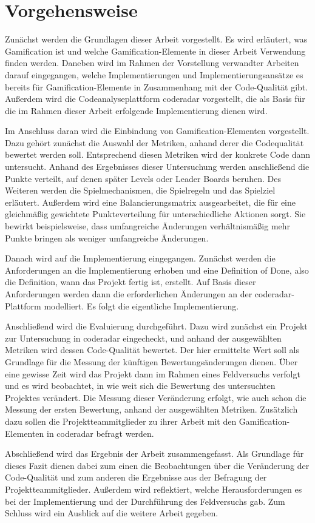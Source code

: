 \documentclass[fontsize=11pt, paper=a4, parskip=half]{scrartcl}
\begin{document}
\section{Vorgehensweise}
Zunächst werden die Grundlagen dieser Arbeit vorgestellt.
Es wird erläutert, was Gamification ist und welche Gamification-Elemente in dieser Arbeit Verwendung finden werden.
Daneben wird im Rahmen der Vorstellung verwandter Arbeiten darauf eingegangen, welche Implementierungen und Implementierungsansätze es bereits für Gamification-Elemente in Zusammenhang mit der Code-Qualität gibt.
Außerdem wird die Codeanalyseplattform coderadar vorgestellt, die als Basis für die im Rahmen dieser Arbeit erfolgende Implementierung dienen wird.

Im Anschluss daran wird die Einbindung von Gamification-Elementen vorgestellt.
Dazu gehört zunächst die Auswahl der Metriken, anhand derer die Codequalität bewertet werden soll.
Entsprechend diesen Metriken wird der konkrete Code dann untersucht.
Anhand des Ergebnisses dieser Untersuchung werden anschließend die Punkte verteilt, auf denen später Levels oder Leader Boards beruhen.
Des Weiteren werden die Spielmechanismen, die Spielregeln und das Spielziel erläutert.
Außerdem wird eine Balancierungsmatrix ausgearbeitet, die für eine gleichmäßig gewichtete Punkteverteilung für unterschiedliche Aktionen sorgt.
Sie bewirkt beispielsweise, dass umfangreiche Änderungen verhältnismäßig mehr Punkte bringen als weniger umfangreiche Änderungen.

Danach wird auf die Implementierung eingegangen.
Zunächst werden die Anforderungen an die Implementierung erhoben und eine Definition of Done, also die Definition, wann das Projekt fertig ist, erstellt.
Auf Basis dieser Anforderungen werden dann die erforderlichen Änderungen an der coderadar-Plattform modelliert.
Es folgt die eigentliche Implementierung.

Anschließend wird die Evaluierung durchgeführt.
Dazu wird zunächst ein Projekt zur Untersuchung in coderadar eingecheckt, und anhand der ausgewählten Metriken wird dessen Code-Qualität bewertet.
Der hier ermittelte Wert soll als Grundlage für die Messung der künftigen Bewertungsänderungen dienen.
Über eine gewisse Zeit wird das Projekt dann im Rahmen eines Feldversuchs verfolgt und es wird beobachtet, in wie weit sich die Bewertung des untersuchten Projektes verändert.
Die Messung dieser Veränderung erfolgt, wie auch schon die Messung der ersten Bewertung, anhand der ausgewählten Metriken.
Zusätzlich dazu sollen die Projektteammitglieder zu ihrer Arbeit mit den Gamification-Elementen in coderadar befragt werden.

Abschließend wird das Ergebnis der Arbeit zusammengefasst.
Als Grundlage für dieses Fazit dienen dabei zum einen die Beobachtungen über die Veränderung der Code-Qualität und zum anderen die Ergebnisse aus der Befragung der Projektteammitglieder.
Außerdem wird reflektiert, welche Herausforderungen es bei der Implementierung und der Durchführung des Feldversuchs gab.
Zum Schluss wird ein Ausblick auf die weitere Arbeit gegeben.

\pagebreak



\end{document}
